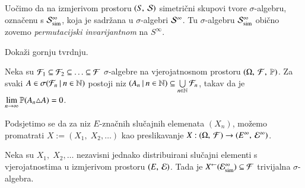 Uo\v cimo da na izmjerivom prostoru $({S}, \: {\mathcal{S}})$ simetri\v cni skupovi tvore $\sigma$-algebru, ozna\v cenu s $\mathcal{S}_{\mathrm{sim}}^\infty$, koja je sadr\v zana u $\sigma$-algebri $\mathcal{S}^\infty$.
Tu $\sigma$-algebru $\mathcal{S}_{\mathrm{sim}}^{\infty}$ obi\v cno zovemo \emph{permutacijski invarijantnom} na $S^\infty$.

\begin{nap} %
    Doka\v zi gornju tvrdnju.
\end{nap}

\begin{zad} \label{zad:9.10}
    Neka su $\mathcal{F}_1 \subseteq \mathcal{F}_2 \subseteq \ldots \subseteq \mathcal{F}$ $\sigma$-algebre na vjerojatnosnom prostoru $(\Omega, \: \mathcal{F}, \: \mathbb{P})$.
    Za svaki $A \in \sigma({\mathcal{F}_n} \: | \: {n \in \mathbb{N}})$ postoji niz $({A_n} \: | \: {n \in \mathbb{N}}) \subseteq \bigcup\limits_{n \in \mathbb{N}}^{} \mathcal{F}_n$, takav da je $\lim\limits_{n \to \infty} \mathbb{P}({A_n \triangle A}) = 0$.
\end{zad}

Podsjetimo se da za niz $E$-zna\v cnih slu\v cajnih elemenata $(X_n)$, mo\v zemo promatrati $X:=(X_1, \; X_2, \ldots)$ kao preslikavanje
$X: ({\Omega}, \: {\mathcal{F}}) \to ({E^\infty}, \: {\mathcal{E}^\infty})$.

\begin{tm}    \label{tm:9.11}
    Neka su $X_1, \; X_2, \ldots$ nezavisni jednako distribuirani slu\v cajni elementi s vjerojatnostima u izmjerivom prostoru $({E}, \: {\mathcal{E}})$.
    Tada je  ${X}^{\leftarrow}(\mathcal{E}_{\mathrm{sim}}^\infty) \subseteq \mathcal{F}$ trivijalna $\sigma$-algebra.
\end{tm}

